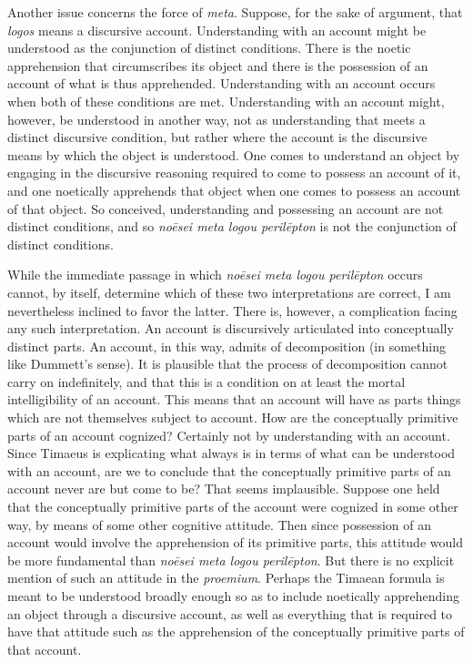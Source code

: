 Another issue concerns the force of \emph{meta}. Suppose, for the sake of argument, that \emph{logos} means a discursive account. Understanding with an account might be understood as the conjunction of distinct conditions. There is the noetic apprehension that circumscribes its object and there is the possession of an account of what is thus apprehended. Understanding with an account occurs when both of these conditions are met. Understanding with an account might, however, be understood in another way, not as understanding that meets a distinct discursive condition, but rather where the account is the discursive means by which the object is understood. One comes to understand an object by engaging in the discursive reasoning required to come to possess an account of it, and one noetically apprehends that object when one comes to possess an account of that object. So conceived, understanding and possessing an account are not distinct conditions, and so \emph{noēsei meta logou perilēpton} is not the conjunction of distinct conditions. 

While the immediate passage in which \emph{noēsei meta logou perilēpton} occurs cannot, by itself, determine which of these two interpretations are correct, I am nevertheless inclined to favor the latter. There is, however, a complication facing any such interpretation. An account is discursively articulated into conceptually distinct parts. An account, in this way, admits of decomposition (in something like Dummett's \citeyear{dummett73} sense). It is plausible that the process of decomposition cannot carry on indefinitely, and that this is a condition on at least the mortal intelligibility of an account. This means that an account will have as parts things which are not themselves subject to account. How are the conceptually primitive parts of an account cognized? Certainly not by understanding with an account. Since Timaeus is explicating what always is in terms of what can be understood with an account, are we to conclude that the conceptually primitive parts of an account never are but come to be? That seems implausible. Suppose one held that the conceptually primitive parts of the account were cognized in some other way, by means of some other cognitive attitude. Then since possession of an account would involve the apprehension of its primitive parts, this attitude would be more fundamental than \emph{noēsei meta logou perilēpton}. But there is no explicit mention of such an attitude in the \emph{proemium}. Perhaps the Timaean formula is meant to be understood broadly enough so as to include noetically apprehending an object through a discursive account, as well as everything that is required to have that attitude such as the apprehension of the conceptually primitive parts of that account.


